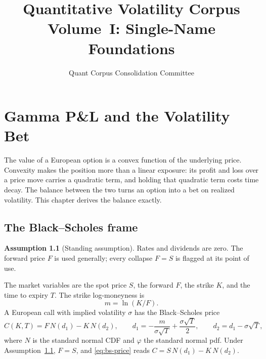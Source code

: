 \documentclass[11pt]{book}
\title{Quantitative Volatility Corpus\\[0.5em]\Large Volume~I: Single-Name Foundations}
\author{Quant Corpus Consolidation Committee}
\date{}
\theoremstyle{plain}
\theoremstyle{definition}
\newtheorem{assumption}[theorem]{Assumption}
\theoremstyle{remark}
\newcommand{\mln}{m}                             %
\newcommand{\npdf}{\varphi}                      %
\newcommand{\ncdf}{N}                            %
\begin{document}
\frontmatter
\maketitle
\tableofcontents

\mainmatter


\chapter{Gamma P\&L and the Volatility Bet}
\label{ch:foundations}

The value of a European option is a convex function of the underlying price. Convexity makes the position more than a linear exposure: its profit and loss over a price move carries a quadratic term, and holding that quadratic term costs time decay. The balance between the two turns an option into a bet on realized volatility. This chapter derives the balance exactly.

\section{The Black--Scholes frame}
\label{sec:bs-frame}

\begin{assumption}[Standing assumption]
\label{ass:zero-rates}
Rates and dividends are zero. The forward price $F$ is used generally; every collapse $F = S$ is flagged at its point of use.
\end{assumption}

The market variables are the spot price $S$, the forward $F$, the strike $K$, and the time to expiry $T$. The strike log-moneyness is
\begin{equation}
\mln = \ln(K/F).
\label{eq:moneyness}
\end{equation}
A European call with implied volatility $\sigma$ has the Black--Scholes price
\begin{equation}
C(K,T) = F\,\ncdf(d_1) - K\,\ncdf(d_2),
\qquad
d_1 = -\frac{\mln}{\sigma\sqrt{T}} + \frac{\sigma\sqrt{T}}{2},
\qquad
d_2 = d_1 - \sigma\sqrt{T},
\label{eq:bs-price}
\end{equation}
where $\ncdf$ is the standard normal CDF and $\npdf$ the standard normal pdf. Under Assumption~\ref{ass:zero-rates}, $F = S$, and \eqref{eq:bs-price} reads $C = S\,\ncdf(d_1) - K\,\ncdf(d_2)$.
\end{document}
